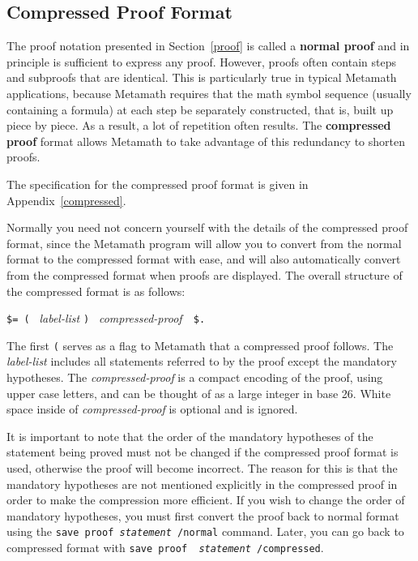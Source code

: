 \subsection{Compressed Proof Format}\label{compressed1}

The proof notation presented in Section~\ref{proof} is called a
{\bf normal proof} and in principle is
sufficient to express any proof.  However, proofs often contain steps and
subproofs that are identical.  This is particularly true in typical
Metamath applications, because Metamath requires that the math
symbol sequence (usually containing a formula) at each step be separately
constructed, that is, built up piece by piece. As a result, a lot of
repetition often results.  The {\bf compressed proof} format allows Metamath
to take advantage of this redundancy to shorten proofs.

The specification for the compressed proof format is given in
Appen\-dix~\ref{compressed}.

Normally you need not concern yourself with the details of the compressed
proof format, since the Metamath program will allow you to convert from
the normal format to the compressed format with ease, and will also
automatically convert from the compressed format when proofs are displayed.
The overall structure of the compressed format is as follows:
\begin{center}
  \texttt{\$= ( } {\em label-list} \texttt{) } {\em compressed-proof\ }\ \texttt{\$.}
\end{center}
The first \texttt{(} serves as a flag to Metamath that a compressed proof
follows.  The {\em label-list} includes all statements referred to by the
proof except the mandatory hypotheses.  The {\em
compressed-proof} is a compact encoding of the proof, using upper case
letters, and can be thought of as a large integer in base 26.  White
space inside of {\em compressed-proof} is
optional and is ignored.

It is important to note that the order of the mandatory hypotheses of
the statement being proved must not be changed if the compressed proof
format is used, otherwise the proof will become incorrect.  The reason
for this is that the mandatory hypotheses are not mentioned explicitly
in the compressed proof in order to make the compression more efficient.
If you wish to change the order of mandatory hypotheses, you must first
convert the proof back to normal format using the \texttt{save proof
{\em statement} /normal} command.
Later, you can go back to compressed format with \texttt{save proof {\em
statement} /compressed}.

